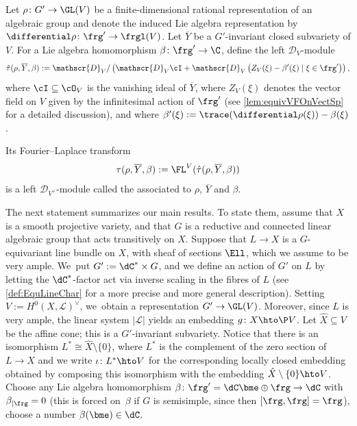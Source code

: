 \begin{dfn} \label{def:tautSys}
Let $\rho \colon G' \to \GL(V)$ be a finite-dimensional rational representation of an algebraic group and denote the induced Lie algebra representation by $\differential\rho \colon \frg' \to \frgl(V)$. Let $\overline{Y}$ be a $G'$-invariant closed subvariety of $V$. For a Lie algebra homomorphism $\beta \colon \frg' \to \C$, define the left $\mathscr{D}_V$\nobreakdash-mod\-ule
\begin{equation}\label{eq:tau_hat}
\hat{\tau}(\rho, \overline{Y}, \beta) := \mathscr{D}_{V}/\left(\mathscr{D}_{V} \cI + \mathscr{D}_{V}\left(Z_V(\xi)-\beta'(\xi) \mid \xi \in \frg'\right)\right),
\end{equation}
where $\cI \subseteq \cO_V$ is the vanishing ideal of $\overline{Y}$, where
$Z_V(\xi)$ denotes the vector field on $V$ given by the infinitesimal action of $\frg'$ (see \cref{lem:equivVFOnVectSp} for a detailed discussion), and where $\beta'(\xi) := \trace(\differential\rho(\xi))-\beta(\xi)$.

Its Fourier--Laplace transform
\begin{equation}\label{eq:tau}
\tau(\rho, \overline{Y}, \beta) := \FL^V(\hat\tau(\rho, \overline{Y}, \beta))
\end{equation}
is a left $\mathscr{D}_{V^\vee}$\nobreakdash-mod\-ule called the  associated to $\rho$, $\overline{Y}$ and $\beta$.
\end{dfn}

The next statement summarizes our main results.
To state them, assume that $X$ is a smooth projective variety, and that $G$ is a reductive and connected linear algebraic group that acts transitively on $X$. Suppose that $L\to X$ is a $G$-equivariant line bundle on $X$, with sheaf of sections $\Ell$,
which we assume to be very ample. We~put $G':=\dC^*\times G$, and we define an action of $G'$ on $L$ by letting the $\dC^*$-factor act via inverse scaling in the fibres of $L$ (see \cref{def:EquLineChar} for a more precise and more general description). Setting $V:=H^0(X, \mathscr{L})^\vee$, we~obtain a representation $G'\to \GL(V)$. Moreover, since $L$ is very ample, the linear system $|\mathscr{L}|$ yields an embedding $g\colon X\hto \P V$. Let $\hat{X}\subseteq V$ be the affine cone; this is a $G'$-invariant subvariety.
Notice that there is an isomorphism $L^* \cong \hat{X}\setminus \{0\}$, where $L^*$ is the complement of the zero section of $L\to X$
and we write
$\iota \colon L^* \hto V$ for the corresponding locally closed embedding obtained by composing this isomorphism with the embedding $\hat{X}\setminus\{0\}\hto V$.
Choose any Lie algebra homomorphism $\beta\colon \frg'=\dC\bme\oplus \frg\to \dC$ with $\beta_{|\frg}=0$ (this is forced on~$\beta$ if $G$ is semisimple, since then $[\frg,\frg]=\frg$), \ie choose a number $\beta(\bme)\in \dC$. 

